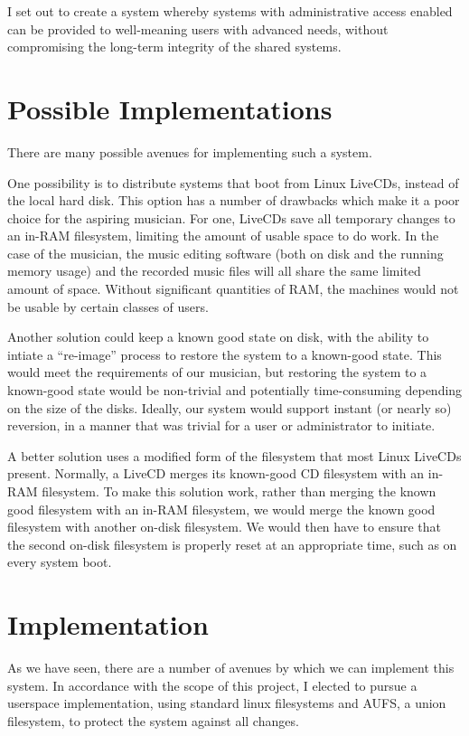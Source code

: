 \documentclass[12pt]{article}
\begin{document}
I set out to create a system whereby systems with administrative access enabled
can be provided to well-meaning users with advanced needs, without compromising
the long-term integrity of the shared systems. 

\section{Possible Implementations}
There are many possible avenues for implementing such a system.

One possibility is to distribute systems that boot from Linux LiveCDs, instead
of the local hard disk.  This option has a number of drawbacks which make it a
poor choice for the aspiring musician. For one, LiveCDs save all temporary
changes to an in-RAM filesystem, limiting the amount of usable space to do
work.  In the case of the musician, the music editing software (both on disk
and the running memory usage) and the recorded music files will all share
the same limited amount of space.  Without significant quantities of RAM, the
machines would not be usable by certain classes of users.

Another solution could keep a known good state on disk, with the ability to
intiate a ``re-image'' process to restore the system to a known-good state.
This would meet the requirements of our musician, but restoring the system
to a known-good state would be non-trivial and potentially time-consuming 
depending on the size of the disks.  Ideally, our system would support 
instant (or nearly so) reversion, in a manner that was trivial for a user
or administrator to initiate.

A better solution uses a modified form of the filesystem that most Linux 
LiveCDs present. Normally, a LiveCD merges its known-good CD filesystem 
with an in-RAM filesystem. To make this solution work, rather than 
merging the known good filesystem with an in-RAM filesystem, we would 
merge the known good filesystem with another on-disk filesystem.  We would
then have to ensure that the second on-disk filesystem is properly reset 
at an appropriate time, such as on every system boot.

\section{Implementation}

As we have seen, there are a number of avenues by which we can implement this 
system.  In accordance with the scope of this project, I elected to pursue
a userspace implementation, using standard linux filesystems and AUFS, a
union filesystem, to protect the system against all changes.
\end{document}
